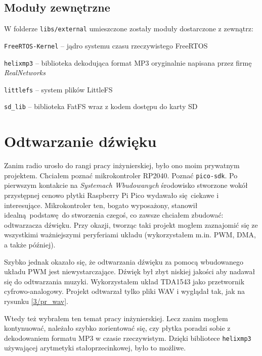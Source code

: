 \documentclass[12pt]{report}
\let\tempone\itemize
\let\temptwo\enditemize
\renewenvironment{itemize}{\tempone\setlength{\itemsep}{0cm}}{\temptwo}
\begin{document}
	\subsection{Moduły zewnętrzne}
	W folderze \lstinline|libs/external| umieszczone zostały moduły dostarczone z zewnątrz:
	\begin{itemize}
		\item \lstinline|FreeRTOS-Kernel| -- jądro systemu czasu rzeczywistego FreeRTOS\textsuperscript{\cite{freertos_kernel}}
		\item \lstinline|helixmp3| -- biblioteka dekodująca format MP3\textsuperscript{\cite{helixmp3_repo}} oryginalnie napisana przez firmę \textit{RealNetworks}\textsuperscript{\cite{realnetworks}}
		\item \lstinline|littlefs| -- system plików LittleFS\textsuperscript{\cite{littlefs}}
		\item \lstinline|sd_lib| -- biblioteka FatFS\textsuperscript{\cite{fatfs}} wraz z kodem dostępu do karty SD\textsuperscript{\cite{sdfs}}
	\end{itemize}

	\section{Odtwarzanie dźwięku}
	Zanim radio urosło do rangi pracy inżynierskiej, było ono moim prywatnym projektem. Chciałem poznać mikrokontroler RP2040. Poznać \lstinline|pico-sdk|. Po pierwszym kontakcie na \textit{Systemach Wbudowanych} środowisko stworzone wokół przystępnej cenowo płytki Raspberry Pi Pico wydawało się ciekawe i interesujące. Mikrokontroler ten, bogato wyposażony, stanowił idealną podstawę do stworzenia czegoś, co zawsze chciałem zbudować: odtwarzacza dźwięku. Przy okazji, tworząc taki projekt mogłem zaznajomić się ze wszystkimi ważniejszymi peryferiami układu (wykorzystałem m.in. PWM, DMA, a także później).
	
	Szybko jednak okazało się, że odtwarzania dźwięku za pomocą wbudowanego układu PWM jest niewystarczające. Dźwięk był zbyt niskiej jakości aby nadawał się do odtwarzania muzyki. Wykorzystałem układ TDA1543 jako przetwornik cyfrowo-analogowy. Projekt odtwarzał tylko pliki WAV i wyglądał tak, jak na rysunku \ref{3/pr_wav}.
	
	Wtedy też wybrałem ten temat pracy inżynierskiej. Lecz zanim mogłem kontynuować, należało szybko zorientować się, czy płytka poradzi sobie z dekodowaniem formatu MP3 w czasie rzeczywistym. Dzięki bibliotece \lstinline|helixmp3| używającej arytmetyki stałoprzecinkowej, było to możliwe.
	
\end{document}
